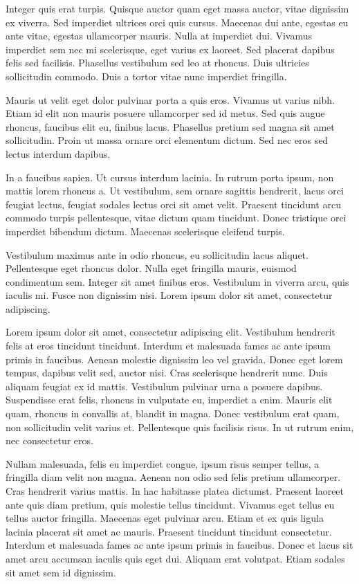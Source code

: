 Integer quis erat turpis. Quisque auctor quam eget massa auctor, vitae dignissim ex viverra. Sed imperdiet ultrices orci quis cursus. Maecenas dui ante, egestas eu ante vitae, egestas ullamcorper mauris. Nulla at imperdiet dui. Vivamus imperdiet sem nec mi scelerisque, eget varius ex laoreet. Sed placerat dapibus felis sed facilisis. Phasellus vestibulum sed leo at rhoncus. Duis ultricies sollicitudin commodo. Duis a tortor vitae nunc imperdiet fringilla.

Mauris ut velit eget dolor pulvinar porta a quis eros. Vivamus ut varius nibh. Etiam id elit non mauris posuere ullamcorper sed id metus. Sed quis augue rhoncus, faucibus elit eu, finibus lacus. Phasellus pretium sed magna sit amet sollicitudin. Proin ut massa ornare orci elementum dictum. Sed nec eros sed lectus interdum dapibus.

In a faucibus sapien. Ut cursus interdum lacinia. In rutrum porta ipsum, non mattis lorem rhoncus a. Ut vestibulum, sem ornare sagittis hendrerit, lacus orci feugiat lectus, feugiat sodales lectus orci sit amet velit. Praesent tincidunt arcu commodo turpis pellentesque, vitae dictum quam tincidunt. Donec tristique orci imperdiet bibendum dictum. Maecenas scelerisque eleifend turpis.

Vestibulum maximus ante in odio rhoncus, eu sollicitudin lacus aliquet. Pellentesque eget rhoncus dolor. Nulla eget fringilla mauris, euismod condimentum sem. Integer sit amet finibus eros. Vestibulum in viverra arcu, quis iaculis mi. Fusce non dignissim nisi. Lorem ipsum dolor sit amet, consectetur adipiscing. 


Lorem ipsum dolor sit amet, consectetur adipiscing elit. Vestibulum hendrerit felis at eros tincidunt tincidunt. Interdum et malesuada fames ac ante ipsum primis in faucibus. Aenean molestie dignissim leo vel gravida. Donec eget lorem tempus, dapibus velit sed, auctor nisi. Cras scelerisque hendrerit nunc. Duis aliquam feugiat ex id mattis. Vestibulum pulvinar urna a posuere dapibus. Suspendisse erat felis, rhoncus in vulputate eu, imperdiet a enim. Mauris elit quam, rhoncus in convallis at, blandit in magna. Donec vestibulum erat quam, non sollicitudin velit varius et. Pellentesque quis facilisis risus. In ut rutrum enim, nec consectetur eros.

Nullam malesuada, felis eu imperdiet congue, ipsum risus semper tellus, a fringilla diam velit non magna. Aenean non odio sed felis pretium ullamcorper. Cras hendrerit varius mattis. In hac habitasse platea dictumst. Praesent laoreet ante quis diam pretium, quis molestie tellus tincidunt. Vivamus eget tellus eu tellus auctor fringilla. Maecenas eget pulvinar arcu. Etiam et ex quis ligula lacinia placerat sit amet ac mauris. Praesent tincidunt tincidunt consectetur. Interdum et malesuada fames ac ante ipsum primis in faucibus. Donec et lacus sit amet arcu accumsan iaculis quis eget dui. Aliquam erat volutpat. Etiam sodales sit amet sem id dignissim.

